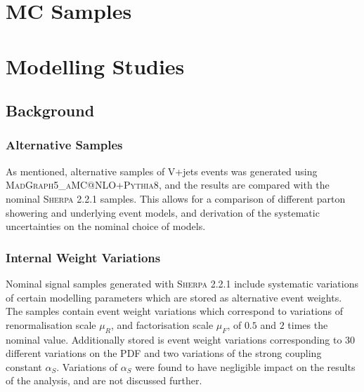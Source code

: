 \section{MC Samples}



\section{Modelling Studies}\label{sec:vhbb_modelling}

\subsection{Background}
%

%
\subsubsection{Alternative Samples}
As mentioned, alternative samples of V+jets events was generated using \textsc{MadGraph5\_aMC@NLO+Pythia8}, and the results are compared with the nominal \textsc{Sherpa 2.2.1} samples. This allows for a comparison of different parton showering and underlying event models, and derivation of the systematic uncertainties on the nominal choice of models.

\subsubsection{Internal Weight Variations}
Nominal signal samples generated with \textsc{Sherpa 2.2.1} include systematic variations of certain modelling parameters which are stored as alternative event weights. The samples contain event weight variations which correspond to variations of renormalisation scale $\mu_R$, and factorisation scale $\mu_F$, of $0.5$ and $2$ times the nominal value. Additionally stored is event weight variations corresponding to $30$ different variations on the PDF and two variations of the strong coupling constant $\alpha_S$. Variations of $\alpha_S$ were found to have negligible impact on the results of the analysis, and are not discussed further. 


